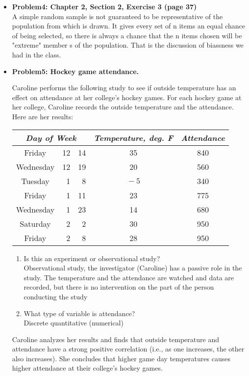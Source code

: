 \documentclass[11pt]{article}\usepackage[]{graphicx}\usepackage[]{color}
\newcommand{\ben}{\begin{enumerate}}
\newcommand{\een}{\end{enumerate}}
\begin{document}
\begin{itemize}
\item \textbf{Problem4: Chapter 2, Section 2, Exercise 3 (page 37)}\\
A simple random sample is not guaranteed to be representative of the population from which is drawn. It gives every set of n items an equal chance of being selected, so there is always a chance that the n items chosen will be "extreme" member s of the population. That is the discussion of biassness we had in the class. 

\item \textbf{Problem5: Hockey game attendance.}

Caroline performs the following study to see if outside temperature
has an effect on attendance at her college's hockey games. For each
hockey game at her college, Caroline records the outside temperature and the attendance. Here are her results:

\hspace{1in}
\begin{tabular}{|cr@{/}r|c|c|} \hline
\multicolumn{3}{|c|}{\emph{Day of Week}} & \emph{Temperature, deg. F} & \emph{Attendance} \\ \hline
Friday & 12&14 & 35 & 840 \\
Wednesday & 12&19 & 20 & 560 \\
Tuesday & 1&8 & $\!-5$ & 340 \\
Friday & 1&11 & 23 & 775 \\
Wednesday & 1&23 & 14 & 680 \\
Saturday & 2&2 & 30 & 950 \\
Friday & 2&8 & 28 & 950 \\
\hline
\end{tabular}
 
\ben 
\item Is this an experiment or observational study?\\
Observational study, the investigator (Caroline) has a passive role in the study. The temperature and the attendance are  watched and data
are recorded, but there is no intervention on the part of the person conducting the study
\item What type of variable is attendance?\\
Discrete quantitative (numerical)
\een

Caroline analyzes her results and finds that
outside temperature and attendance have a strong
positive correlation (i.e., as one increases, the other also increases).
She concludes that higher game day temperatures causes higher
attendance at their college's hockey games.


\end{itemize}
\end{document}
